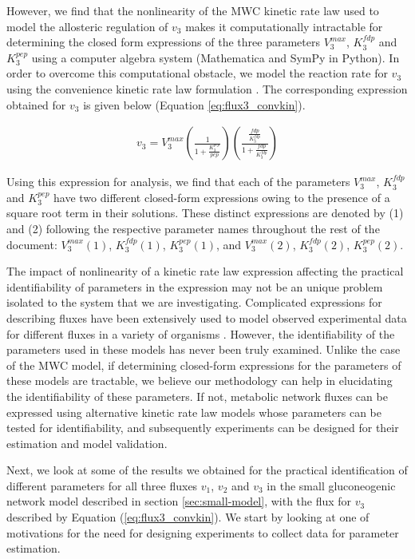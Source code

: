 \documentclass[10pt]{article}
\begin{document}
	However, we find that the nonlinearity of the MWC kinetic rate law used to model the allosteric regulation of $v_3$ makes it computationally intractable for determining the closed form expressions of the three parameters $V_3^{max}$, $K_3^{fdp}$ and $K_3^{pep}$ using a computer algebra system (Mathematica and SymPy in Python). In order to overcome this computational obstacle, we model the reaction rate for $v_3$ using the convenience kinetic rate law formulation \parencite{Liebermeister2006}. The corresponding expression obtained for $v_3$ is given below (Equation \ref{eq:flux3_convkin}). 
	
	\begin{align}\label{eq:flux3_convkin}
	v_3 = V_3^{max}\left(\frac{1}{1 + \frac{K_3^{pep}}{pep}}\right)\left(\frac{\frac{fdp}{K_3^{fdp}}}{1 + \frac{fdp}{K_3^{fdp}}}\right)
	\end{align}
	
	Using this expression for analysis, we find that each of the parameters $V_3^{max}$, $K_3^{fdp}$ and $K_3^{pep}$ have two different closed-form expressions owing to the presence of a square root term in their solutions. These distinct expressions are denoted by (1) and (2) following the respective parameter names throughout the rest of the document: $V_3^{max}(1)$, $K_3^{fdp}(1)$, $K_3^{pep}(1)$, and $V_3^{max}(2)$, $K_3^{fdp}(2)$, $K_3^{pep}(2)$. 
	
	The impact of nonlinearity of a kinetic rate law expression affecting the practical identifiability of parameters in the expression may not be an unique problem isolated to the system that we are investigating. Complicated expressions for describing fluxes have been extensively used to model observed experimental data for different fluxes in a variety of organisms \parencite{Chassagnole2002a, Peskov2012, VanHeerden2014}. However, the identifiability of the parameters used in these models has never been truly examined. Unlike the case of the MWC model, if determining closed-form expressions for the parameters of these models are tractable, we believe our methodology can help in elucidating the identifiability of these parameters. If not, metabolic network fluxes can be expressed using alternative kinetic rate law models whose parameters can be tested for identifiability, and subsequently experiments can be designed for their estimation and model validation.
	
	Next, we look at some of the results we obtained for the practical identification of different parameters for all three fluxes $v_1$, $v_2$ and $v_3$ in the small gluconeogenic network model described in section \ref{sec:small-model}, with the flux for $v_3$ described by Equation (\ref{eq:flux3_convkin}). We start by looking at one of motivations for the need for designing experiments to collect data for parameter estimation.
	
\end{document}
